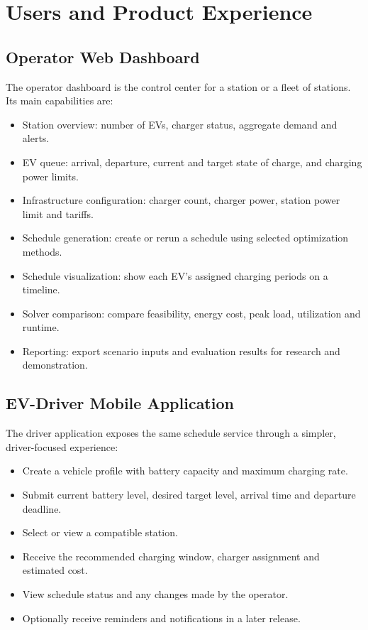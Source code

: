 \documentclass[11pt,a4paper]{article}
\begin{document}
\section{Users and Product Experience}

\subsection{Operator Web Dashboard}

The operator dashboard is the control center for a station or a fleet of stations. Its main capabilities are:
\begin{itemize}
  \item Station overview: number of EVs, charger status, aggregate demand and alerts.
  \item EV queue: arrival, departure, current and target state of charge, and charging power limits.
  \item Infrastructure configuration: charger count, charger power, station power limit and tariffs.
  \item Schedule generation: create or rerun a schedule using selected optimization methods.
  \item Schedule visualization: show each EV's assigned charging periods on a timeline.
  \item Solver comparison: compare feasibility, energy cost, peak load, utilization and runtime.
  \item Reporting: export scenario inputs and evaluation results for research and demonstration.
\end{itemize}

\subsection{EV-Driver Mobile Application}

The driver application exposes the same schedule service through a simpler, driver-focused experience:
\begin{itemize}
  \item Create a vehicle profile with battery capacity and maximum charging rate.
  \item Submit current battery level, desired target level, arrival time and departure deadline.
  \item Select or view a compatible station.
  \item Receive the recommended charging window, charger assignment and estimated cost.
  \item View schedule status and any changes made by the operator.
  \item Optionally receive reminders and notifications in a later release.
\end{itemize}
\end{document}
